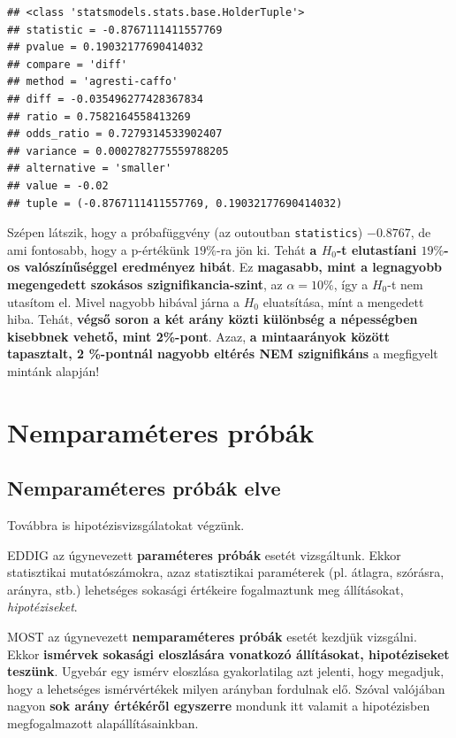 \documentclass[
]{book}
\begin{document}
\begin{verbatim}
## <class 'statsmodels.stats.base.HolderTuple'>
## statistic = -0.8767111411557769
## pvalue = 0.19032177690414032
## compare = 'diff'
## method = 'agresti-caffo'
## diff = -0.035496277428367834
## ratio = 0.7582164558413269
## odds_ratio = 0.7279314533902407
## variance = 0.0002782775559788205
## alternative = 'smaller'
## value = -0.02
## tuple = (-0.8767111411557769, 0.19032177690414032)
\end{verbatim}

Szépen látszik, hogy a próbafüggvény (az outoutban \texttt{statistics}) \(-0.8767\), de ami fontosabb, hogy a p-értékünk \(19\%\)-ra jön ki. Tehát \textbf{a \(H_0\)-t elutastíani \(19\%\)-os valószínűséggel eredményez hibát}. Ez \textbf{magasabb, mint a legnagyobb megengedett szokásos szignifikancia-szint}, az \(\alpha=10\%\), így a \(H_0\)-t nem utasítom el. Mivel nagyobb hibával járna a \(H_0\) eluatsítása, mínt a mengedett hiba. Tehát, \textbf{végső soron a két arány közti különbség a népességben kisebbnek vehető, mint 2\%-pont}.
Azaz, \textbf{a mintaarányok között tapasztalt, 2 \%-pontnál nagyobb eltérés NEM szignifikáns} a megfigyelt mintánk alapján!

\chapter{Nemparaméteres próbák}\label{nemparamuxe9teres-pruxf3buxe1k}

\section{Nemparaméteres próbák elve}\label{nemparamuxe9teres-pruxf3buxe1k-elve}

Továbbra is hipotézisvizsgálatokat végzünk.

EDDIG az úgynevezett \textbf{paraméteres próbák} esetét vizsgáltunk. Ekkor statisztikai mutatószámokra, azaz statisztikai paraméterek (pl. átlagra, szórásra, arányra, stb.) lehetséges sokasági értékeire fogalmaztunk meg állításokat, \emph{hipotéziseket}.

MOST az úgynevezett \textbf{nemparaméteres próbák} esetét kezdjük vizsgálni. Ekkor \textbf{ismérvek sokasági eloszlására vonatkozó állításokat, hipotéziseket teszünk}. Ugyebár egy ismérv eloszlása gyakorlatilag azt jelenti, hogy megadjuk, hogy a lehetséges ismérvértékek milyen arányban fordulnak elő. Szóval valójában nagyon \textbf{sok arány értékéről egyszerre} mondunk itt valamit a hipotézisben megfogalmazott alapállításainkban.
\end{document}
